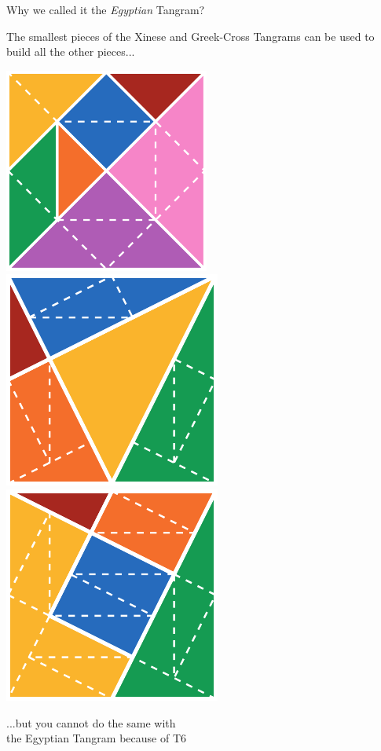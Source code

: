 \documentclass[14pt]{beamer}
\begin{document}

        \begin{frame}{Why we called it the \emph{Egyptian} Tangram?}
        \begin{center}
            The smallest pieces of the Xinese and Greek-Cross Tangrams can be used to build all the other pieces...
            
            \bigskip \bigskip

            \includegraphics[height=15ex]{figures/figure003c.pdf}\quad\includegraphics[height=15ex]{figures/figure003a.pdf}\quad\includegraphics[height=15ex]{figures/figure003b.pdf} \\

            \bigskip \bigskip

            ...but you cannot do the same with\\the Egyptian Tangram because of T6
        \end{center}
    \end{frame}

\end{document}
